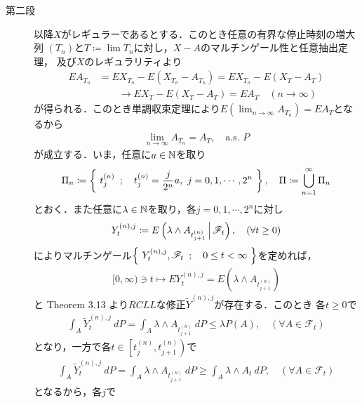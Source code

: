 \begin{prf}
\begin{description}
			\item[第二段]
				以降$X$がレギュラーであるとする．このとき任意の有界な停止時刻の増大列
				$(T_n)$と$T \coloneqq \lim T_n$に対し，$X-A$のマルチンゲール性と任意抽出定理，
				及び$X$のレギュラリティより
				\begin{align}
					EA_{T_n} &= EX_{T_n} - E(X_{T_n} - A_{T_n})
					= EX_{T_n} - E(X_T - A_T) \\
					&\qquad \longrightarrow EX_T - E(X_T - A_T)
					= EA_T
					\quad (n \longrightarrow \infty)
				\end{align}
				が得られる．このとき単調収束定理により$E\left(\lim_{n \to \infty} A_{T_n}\right) = EA_T$となるから
				\begin{align}
					\lim_{n \to \infty} A_{T_n} = A_T,
					\quad \mbox{a.s. $P$}
					\label{eq:chapter_1_theorem_4_14_1}
				\end{align}
				が成立する．いま，任意に$a \in \mathbb{N}$を取り
				\begin{align}
					\Pi_n \coloneqq 
					\Set{t^{(n)}_j}{t^{(n)}_j = \frac{j}{2^n}a,\ j=0,1,\cdots,2^n},
					\quad \Pi \coloneqq \bigcup_{n=1}^\infty \Pi_n
				\end{align}
				とおく．また任意に$\lambda \in \mathbb{N}$を取り，各$j = 0,1,\cdots,2^n$に対し
				\begin{align}
					Y^{(n),j}_t \coloneqq
					E\left( \lambda \wedge A_{t^{(n)}_{j+1}} \, \middle|\, \mathscr{F}_t \right),
					\quad (\forall t \geq 0)
				\end{align}
				によりマルチンゲール$\left\{\ Y^{(n),j}_t,\mathscr{F}_t\ \, ; \quad 0 \leq t < \infty\ \right\}$を定めれば，
				\begin{align}
					[0,\infty) \ni t \longmapsto EY^{(n),j}_t 
					= E\left(\lambda \wedge A_{t^{(n)}_{j+1}}\right)
				\end{align}
				と Theorem 3.13 より$RCLL$な修正$\tilde{Y}^{(n),j}$が存在する．このとき
				各$t \geq 0$で
				\begin{align}
					\int_A \tilde{Y}^{(n),j}_t\ dP 
					= \int_A \lambda \wedge A_{t^{(n)}_{j+1}}\ dP
					\leq \lambda P(A),
					\quad (\forall A \in \mathscr{F}_t)
				\end{align}
				となり，一方で各$t \in \left[t^{(n)}_j, t^{(n)}_{j+1} \right)$で
				\begin{align}
					\int_A \tilde{Y}^{(n),j}_t\ dP
					= \int_A \lambda \wedge A_{t^{(n)}_{j+1}}\ dP
					\geq \int_A \lambda \wedge A_t\ dP,
					\quad (\forall A \in \mathscr{F}_t) 
				\end{align}
				となるから，各$j$で
				\begin{align}

\end{align}
\end{description}
\end{prf}
